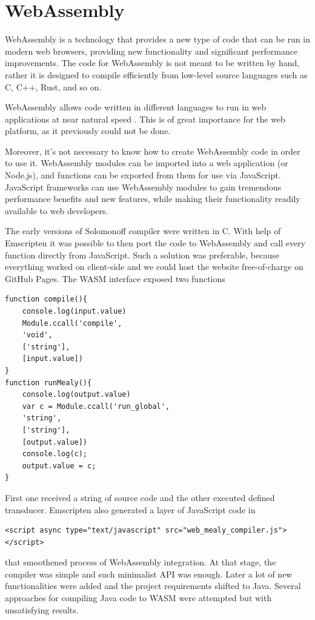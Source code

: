 \section{WebAssembly}

WebAssembly \cite{webassembly} is a technology 
that provides a new type of code 
that can be run in modern web browsers, 
providing new functionality and significant 
performance improvements. The code 
for WebAssembly is not meant to be 
written by hand, rather it is designed 
to compile efficiently from low-level 
source languages
such as C, C++, 
Rust, and so on.

WebAssembly allows code
 written
  in 
 different languages
 to run in web applications 
 at near natural speed \cite{webassembly_speed,webassembly_speed2,webassembly_speed3}. 
 This is of great importance 
 for the web platform, as 
 it previously could not be done.

Moreover, it's not necessary to know how to create WebAssembly code in order to use it. WebAssembly modules can be imported into a web application (or Node.js), and functions can be exported from them for use via JavaScript. JavaScript frameworks can use WebAssembly modules to gain tremendous performance benefits and new features, while making their functionality readily available to web developers.


The early versions of Solomonoff compiler were written in C. With help of Emscripten it was possible to then port the code to WebAssembly and call every function directly from JavaScript. Such a solution was preferable, because everything worked on client-side and we could host the website free-of-charge on GitHub
Pages. The WASM interface exposed two functions
\begin{lstlisting}
function compile(){
	console.log(input.value)
	Module.ccall('compile',
	'void',
	['string'], 
	[input.value])
}
function runMealy(){
	console.log(output.value)
	var c = Module.ccall('run_global',
	'string',
	['string'], 
	[output.value])
	console.log(c);
	output.value = c;
}
\end{lstlisting}
First one received a string of source code and the other executed defined transducer. 
Emscripten also generated a layer of JavaScript code in
\begin{lstlisting}
<script async type="text/javascript" src="web_mealy_compiler.js"></script>
\end{lstlisting}
that smoothened process of WebAssembly integration.
At that stage, the compiler was simple and such minimalist API was enough. Later a lot of new functionalities were added and the project requirements shifted to Java. Several approaches for compiling Java code to WASM were attempted but with unsatisfying results.


